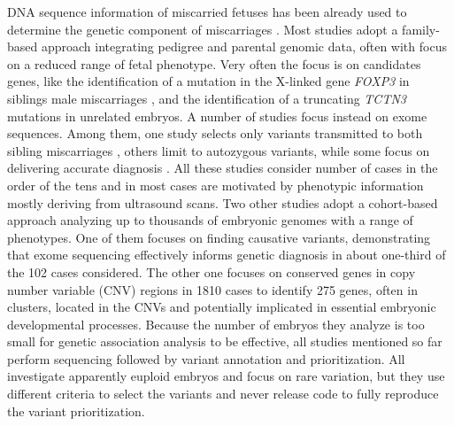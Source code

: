
DNA sequence information of miscarried fetuses has been already used to determine the genetic component of miscarriages \cite{rajcan2020next, filges2015exome}. Most studies adopt a family-based approach integrating pedigree and parental genomic data, often with focus on a reduced range of fetal phenotype\cite{bondeson2017nonsense, dohrn2015ecel1,wilbe2015musk, cristofoli2017novel}. Very often the focus is on candidates genes, like the identification of a mutation in the X-linked gene \textit{FOXP3} in siblings male miscarriages \cite{rae2015novel}, and the identification of a truncating \textit{TCTN3} mutations in unrelated embryos\cite{thomas2012tctn3}. A number of studies focus instead on exome sequences\cite{shamseldin2015identification, qiao2016whole,fu2018whole, meier2019exome, yates2017whole}. Among them, one study selects only variants transmitted to both sibling miscarriages \cite{qiao2016whole}, others limit to autozygous variants\cite{thomas2012tctn3, shamseldin2015identification}, while some focus on delivering accurate diagnosis \cite{meier2019exome}. All these studies consider number of cases in the order of the tens and in most cases are motivated by phenotypic information mostly deriving from ultrasound scans. 
Two other studies adopt a cohort-based approach analyzing up to thousands of embryonic genomes with a range of phenotypes\cite{chen2017characterization,zhao2020exome}. One of them focuses on finding causative variants, demonstrating that exome sequencing effectively informs genetic diagnosis in about one-third of the 102 cases considered\cite{zhao2020exome}. The other one focuses on conserved genes in copy number variable (CNV) regions in 1810 cases to identify 275 genes, often in clusters, located in the CNVs and potentially implicated in essential embryonic developmental processes\cite{chen2017characterization}.
Because the number of embryos they analyze is too small for genetic association analysis to be effective, all studies mentioned so far perform sequencing followed by variant annotation and prioritization. All investigate apparently euploid embryos and focus on rare variation, but they use different criteria to select the variants and never release code to fully reproduce the variant prioritization.  


